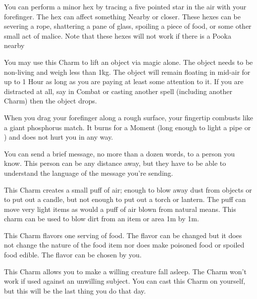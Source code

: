 
  You can perform a minor hex by tracing a five pointed star in the air with your forefinger. The hex can affect something Nearby or closer.  These hexes can be severing a rope, shattering a pane of glass, spoiling a piece of food, or some other small act of malice.  Note that these hexes will not work if there is a Pooka nearby


  You may use this Charm to lift an object via magic alone. The object needs to be non-living and weigh less than 1kg. The object will remain floating in mid-air for up to 1 Hour as long as you are paying at least some attention to it. If you are distracted at all, say in Combat or casting another spell (including another Charm) then the object drops. 


  When you drag your forefinger along a rough surface, your fingertip combusts like a giant phosphorus match. It burns for a Moment (long enough to light a pipe or ) and does not hurt you in any way.


  You can send a brief message, no more than a dozen words, to a person you know. This person can be any distance away, but they have to be able to understand the language of the message you're sending.


  This Charm creates a small puff of air; enough to blow away dust from objects or to put out a candle, but not enough to put out a torch or lantern. The puff can move very light items as would a puff of air blown from natural means. This charm can be used to blow dirt from an item or area 1m by 1m. 


  This Charm flavors one serving of food. The flavor can be changed but it does not change the nature of the food item nor does make poisoned food or spoiled food edible. The flavor can be chosen by you. 


  This Charm allows you to make a willing creature fall asleep. The Charm won't work if used against an unwilling subject. You can cast this Charm on yourself, but this will be the last thing you do that day.

